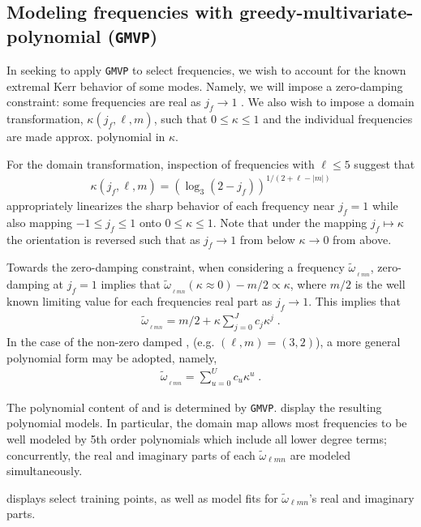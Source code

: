 \documentclass[twocolumn,aps,prd,floatfix,preprintnumbers,a4paper,nofootinbib,
superscriptaddress,10pt]{revtex4-1}
\newcommand{\cw}{\tilde{\omega}}
\def\jf{j_f}
\def\lmn{_{\ell m n}}
\def\gmvp#1{greedy-multivariate-polynomial#1
  (\texttt{GMVP}#1)\gdef\gmvp{\texttt{GMVP}}}
\begin{document}
\subsection{Modeling \qnm{} frequencies with \gmvp{}}
%
%
%
In seeking to apply \gmvp{} to select \qnm{} frequencies, we wish to account for the known extremal Kerr behavior of some modes.
%
Namely, we will impose a zero-damping constraint: some frequencies are real as $\jf \rightarrow 1$ \cite{Zimmerman:2015trm}.
%
We also wish to impose a domain transformation, $\kappa(\jf,\ell,m)$, such that $0 \leq \kappa \leq 1$ and the individual \qnm{} frequencies are made approx. polynomial in $\kappa$.
%
\par For the domain transformation, inspection of \qnm{} frequencies with $\ell \leq 5$ suggest that
%
\begin{align}
  \label{eq:kappa}
  \kappa(\jf,\ell,m) = \left( \log_3( 2 - \jf ) \right)^{1/(2+\ell-|m|)}
\end{align}
%
appropriately linearizes the sharp behavior of each frequency near $\jf=1$ while also mapping $-1 \le \jf \le 1$ onto $0 \le \kappa \le 1$. Note that under the mapping $j_f \mapsto \kappa$ the orientation is reversed such that as $j_f \rightarrow 1$ from below $\kappa \rightarrow 0$ from above.
%
\par Towards the zero-damping constraint, when considering a \qnm{} frequency $\cw_{\lmn}$, zero-damping at $\jf=1$ implies that $\cw_{\lmn}(\kappa \approx 0)-m/2 \propto \kappa$, where $m/2$ is the well known limiting value for each \qnm{} frequencies real part as $\jf\rightarrow 1$.
%
This implies that
%
\begin{align}
  \label{eq:zd}
  \cw_{\lmn} = m/2 + \kappa \sum_{j=0}^{J} c_j \kappa^j \; .
\end{align}
%
In the case of the non-zero damped , (e.g. $(\ell,m)=(3,2)$), a more general polynomial form may be adopted, namely,
%
\begin{align}
  \label{eq:nzd}
  \cw_{\lmn} = \sum_{u=0}^{U} c_u \kappa^u \; .
\end{align}
%
\par The polynomial content of  and  is determined by \gmvp{}.
%
 display the resulting polynomial models.
%
In particular, the domain map allows most \qnm{} frequencies to be well modeled by 5th order polynomials which include all lower degree terms; concurrently, the real and imaginary parts of each $\cw\lmn$ are modeled simultaneously.
%
\par {} displays select training points, as well as model fits for $\cw\lmn$'s real and imaginary parts.
\end{document}

